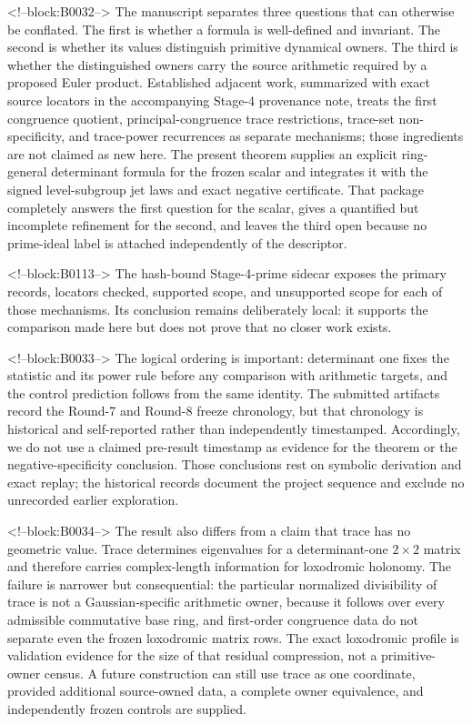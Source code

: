 \documentclass[11pt,a4paper]{article}
\theoremstyle{definition}
\theoremstyle{remark}
\begin{document}
<!--block:B0032-->
The manuscript separates three questions that can otherwise be conflated. The first is whether a formula is well-defined and invariant. The second is whether its values distinguish primitive dynamical owners. The third is whether the distinguished owners carry the source arithmetic required by a proposed Euler product. Established adjacent work, summarized with exact source locators in the accompanying Stage-4 provenance note, treats the first congruence quotient, principal-congruence trace restrictions, trace-set non-specificity, and trace-power recurrences as separate mechanisms; those ingredients are not claimed as new here. The present theorem supplies an explicit ring-general determinant formula for the frozen scalar and integrates it with the signed level-subgroup jet laws and exact negative certificate. That package completely answers the first question for the scalar, gives a quantified but incomplete refinement for the second, and leaves the third open because no prime-ideal label is attached independently of the descriptor.

<!--block:B0113-->
The hash-bound Stage-4-prime sidecar exposes the primary records, locators checked, supported scope, and unsupported scope for each of those mechanisms. Its conclusion remains deliberately local: it supports the comparison made here but does not prove that no closer work exists.

<!--block:B0033-->
The logical ordering is important: determinant one fixes the statistic and its power rule before any comparison with arithmetic targets, and the control prediction follows from the same identity. The submitted artifacts record the Round-7 and Round-8 freeze chronology, but that chronology is historical and self-reported rather than independently timestamped. Accordingly, we do not use a claimed pre-result timestamp as evidence for the theorem or the negative-specificity conclusion. Those conclusions rest on symbolic derivation and exact replay; the historical records document the project sequence and exclude no unrecorded earlier exploration.

<!--block:B0034-->
The result also differs from a claim that trace has no geometric value. Trace determines eigenvalues for a determinant-one \(2\times2\) matrix and therefore carries complex-length information for loxodromic holonomy. The failure is narrower but consequential: the particular normalized divisibility of trace is not a Gaussian-specific arithmetic owner, because it follows over every admissible commutative base ring, and first-order congruence data do not separate even the frozen loxodromic matrix rows. The exact loxodromic profile is validation evidence for the size of that residual compression, not a primitive-owner census. A future construction can still use trace as one coordinate, provided additional source-owned data, a complete owner equivalence, and independently frozen controls are supplied.
\end{document}
